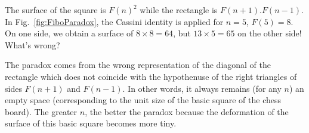 The surface of the square is $F(n)^2$ while the rectangle is $F(n+1).F(n-1)$.
In Fig.~\ref{fig:FiboParadox}, the Cassini identity is applied for $n=5$, $F(5)=8$. 
On one side, we obtain a surface of $8 \times 8 = 64$, but $13 \times 5 = 65$ on the other side!
What's wrong?

The paradox comes from the wrong representation of the diagonal of the rectangle which does not coincide with the hypothenuse
of the right triangles of sides $F(n+1)$ and $F(n-1)$.
In other words, it always remains (for any $n$) an empty space (corresponding to the unit size of the basic square of the chess board).
The greater $n$, the better the paradox because the deformation of the surface of this basic square becomes more tiny. 


%
%




